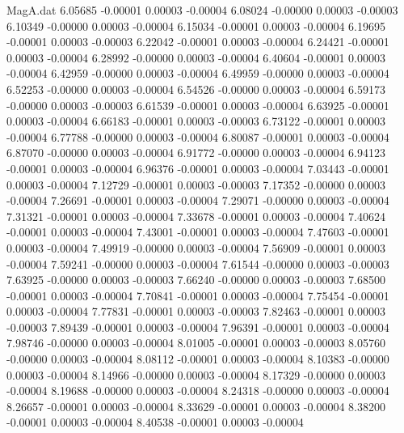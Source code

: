 \begin{filecontents}{MagA.dat}
   6.05685   -0.00001    0.00003   -0.00004
   6.08024   -0.00000    0.00003   -0.00003
   6.10349   -0.00000    0.00003   -0.00004
   6.15034   -0.00001    0.00003   -0.00004
   6.19695   -0.00001    0.00003   -0.00003
   6.22042   -0.00001    0.00003   -0.00004
   6.24421   -0.00001    0.00003   -0.00004
   6.28992   -0.00000    0.00003   -0.00004
   6.40604   -0.00001    0.00003   -0.00004
   6.42959   -0.00000    0.00003   -0.00004
   6.49959   -0.00000    0.00003   -0.00004
   6.52253   -0.00000    0.00003   -0.00004
   6.54526   -0.00000    0.00003   -0.00004
   6.59173   -0.00000    0.00003   -0.00003
   6.61539   -0.00001    0.00003   -0.00004
   6.63925   -0.00001    0.00003   -0.00004
   6.66183   -0.00001    0.00003   -0.00003
   6.73122   -0.00001    0.00003   -0.00004
   6.77788   -0.00000    0.00003   -0.00004
   6.80087   -0.00001    0.00003   -0.00004
   6.87070   -0.00000    0.00003   -0.00004
   6.91772   -0.00000    0.00003   -0.00004
   6.94123   -0.00001    0.00003   -0.00004
   6.96376   -0.00001    0.00003   -0.00004
   7.03443   -0.00001    0.00003   -0.00004
   7.12729   -0.00001    0.00003   -0.00003
   7.17352   -0.00000    0.00003   -0.00004
   7.26691   -0.00001    0.00003   -0.00004
   7.29071   -0.00000    0.00003   -0.00004
   7.31321   -0.00001    0.00003   -0.00004
   7.33678   -0.00001    0.00003   -0.00004
   7.40624   -0.00001    0.00003   -0.00004
   7.43001   -0.00001    0.00003   -0.00004
   7.47603   -0.00001    0.00003   -0.00004
   7.49919   -0.00000    0.00003   -0.00004
   7.56909   -0.00001    0.00003   -0.00004
   7.59241   -0.00000    0.00003   -0.00004
   7.61544   -0.00000    0.00003   -0.00003
   7.63925   -0.00000    0.00003   -0.00003
   7.66240   -0.00000    0.00003   -0.00003
   7.68500   -0.00001    0.00003   -0.00004
   7.70841   -0.00001    0.00003   -0.00004
   7.75454   -0.00001    0.00003   -0.00004
   7.77831   -0.00001    0.00003   -0.00003
   7.82463   -0.00001    0.00003   -0.00003
   7.89439   -0.00001    0.00003   -0.00004
   7.96391   -0.00001    0.00003   -0.00004
   7.98746   -0.00000    0.00003   -0.00004
   8.01005   -0.00001    0.00003   -0.00003
   8.05760   -0.00000    0.00003   -0.00004
   8.08112   -0.00001    0.00003   -0.00004
   8.10383   -0.00000    0.00003   -0.00004
   8.14966   -0.00000    0.00003   -0.00004
   8.17329   -0.00000    0.00003   -0.00004
   8.19688   -0.00000    0.00003   -0.00004
   8.24318   -0.00000    0.00003   -0.00004
   8.26657   -0.00001    0.00003   -0.00004
   8.33629   -0.00001    0.00003   -0.00004
   8.38200   -0.00001    0.00003   -0.00004
   8.40538   -0.00001    0.00003   -0.00004

\end{filecontents}

